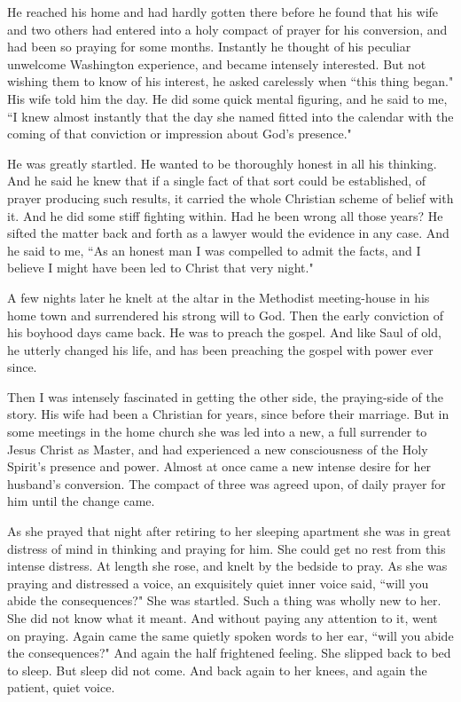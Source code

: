 He reached his home and had hardly gotten there before he found that his
wife and two others had entered into a holy compact of prayer for his
conversion, and had been so praying for some months. Instantly he thought
of his peculiar unwelcome Washington experience, and became intensely
interested. But not wishing them to know of his interest, he asked
carelessly when ``this thing began." His wife told him the day. He did some
quick mental figuring, and he said to me, ``I knew almost instantly that
the day she named fitted into the calendar with the coming of that
conviction or impression about God's presence."

He was greatly startled. He wanted to be thoroughly honest in all his
thinking. And he said he knew that if a single fact of that sort could be
established, of prayer producing such results, it carried the whole
Christian scheme of belief with it. And he did some stiff fighting within.
Had he been wrong all those years? He sifted the matter back and forth as
a lawyer would the evidence in any case. And he said to me, ``As an honest
man I was compelled to admit the facts, and I believe I might have been
led to Christ that very night."

A few nights later he knelt at the altar in the Methodist meeting-house in
his home town and surrendered his strong will to God. Then the early
conviction of his boyhood days came back. He was to preach the gospel. And
like Saul of old, he utterly changed his life, and has been preaching the
gospel with power ever since.

Then I was intensely fascinated in getting the other side, the
praying-side of the story. His wife had been a Christian for years, since
before their marriage. But in some meetings in the home church she was
led into a new, a full surrender to Jesus Christ as Master, and had
experienced a new consciousness of the Holy Spirit's presence and power.
Almost at once came a new intense desire for her husband's conversion. The
compact of three was agreed upon, of daily prayer for him until the change
came.

As she prayed that night after retiring to her sleeping apartment she was
in great distress of mind in thinking and praying for him. She could get
no rest from this intense distress. At length she rose, and knelt by the
bedside to pray. As she was praying and distressed a voice, an exquisitely
quiet inner voice said, ``will you abide the consequences?" She was
startled. Such a thing was wholly new to her. She did not know what it
meant. And without paying any attention to it, went on praying. Again came
the same quietly spoken words to her ear, ``will you abide the
consequences?" And again the half frightened feeling. She slipped back to
bed to sleep. But sleep did not come. And back again to her knees, and
again the patient, quiet voice.

